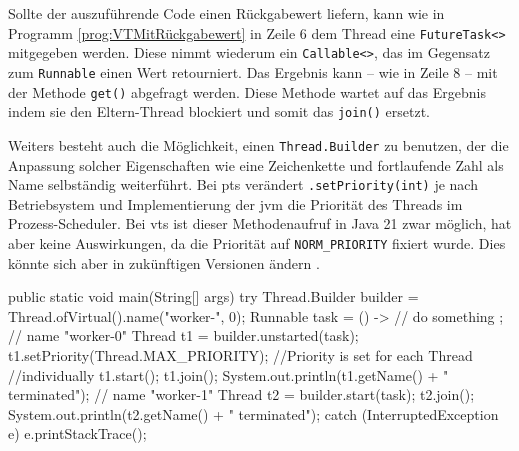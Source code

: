     \begin{program} [H]
        \caption{\Glspl{vt} mit Rückgabewert}
        \label{prog:VTMitRückgabewert}
    \begin{JavaCode}[language=Java, numbers=left]
public static void main(String[] args) {
    FutureTask<String> futureTask = new FutureTask<>(() -> {
        Thread.sleep(1000);
        return "Task completed";
    });
    Thread.ofVirtual().start(futureTask);
    try {
        System.out.println(STR."Result: \{futureTask.get()}");
    } catch (Exception e) {
        e.printStackTrace();
    }
}\end{JavaCode}
    \end{program}
    Sollte der auszuführende Code einen Rückgabewert liefern, kann wie in Programm \ref{prog:VTMitRückgabewert} in Zeile 6 dem Thread eine \texttt{FutureTask<>} mitgegeben werden. Diese nimmt wiederum
    ein \texttt{Callable<>}, das im Gegensatz zum \texttt{Runnable} einen Wert retourniert. Das Ergebnis kann -- wie in Zeile 8 -- mit der Methode \texttt{get()} abgefragt werden.
    Diese Methode wartet auf das Ergebnis indem sie den Eltern-Thread blockiert und somit das \texttt{join()} ersetzt.



    Weiters besteht auch die Möglichkeit, einen \texttt{Thread.Builder} zu benutzen, der die Anpassung solcher Eigenschaften wie eine Zeichenkette und fortlaufende Zahl
    als Name selbständig weiterführt.
    Bei \Glspl{pt} verändert \texttt{.setPriority(int)} je nach Betriebsystem und Implementierung der \gls{jvm} die Priorität des Threads im Prozess-Scheduler. Bei \Glspl{vt} ist dieser Methodenaufruf in Java 21 zwar
    möglich, hat aber keine Auswirkungen, da die Priorität auf \texttt{NORM\_PRIORITY} fixiert wurde. Dies könnte sich aber in zukünftigen Versionen ändern \cite{JEP444}.

    
    
    \begin{program} [H]
        \caption{Beispiel eines \texttt{Thread.Builder} für \Glspl{vt} in Java}
        \label{prog:ErstellungEinesVTBuilders}
    \begin{JavaCode}[language=Java, numbers=left]
public static void main(String[] args) {
    try {
        Thread.Builder builder = Thread.ofVirtual().name("worker-", 0);
        Runnable task = () -> {
            // do something
        };
        // name "worker-0"
        Thread t1 = builder.unstarted(task);
        t1.setPriority(Thread.MAX_PRIORITY);    //Priority is set for each Thread 
                                                //individually   
        t1.start(); t1.join();
        System.out.println(t1.getName() + " terminated");
        // name "worker-1"
        Thread t2 = builder.start(task);   
        t2.join();  
        System.out.println(t2.getName() + " terminated");
    } catch (InterruptedException e) {
        e.printStackTrace();
    }
}\end{JavaCode}
    \end{program}

